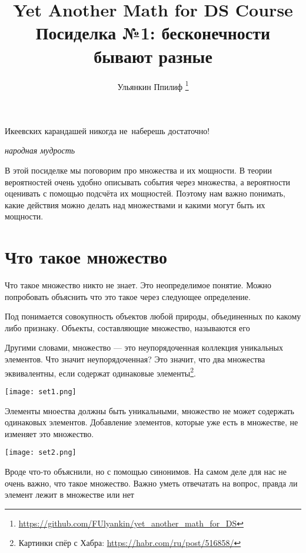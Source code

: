 \documentclass[12pt, a4paper]{article}
\date{ } %
\title{Yet Another Math for DS Course \\ Посиделка №1: бесконечности бывают разные}
\author{Ульянкин Ппилиф \thanks{\url{https://github.com/FUlyankin/yet_another_math_for_DS}}}
\begin{document}

\maketitle

\epigraph{Икеевских карандашей никогда не~наберешь достаточно!}{\textit{народная мудрость}}

В этой посиделке мы поговорим про множества и их мощности. В теории вероятностей очень удобно описывать события через множества, а вероятности оценивать с помощью подсчёта их мощностей. Поэтому нам важно понимать, какие действия можно делать над множествами и какими могут быть их мощности.

\section{Что такое множество} 

Что такое множество никто не знает. Это неопределимое понятие. Можно попробовать объяснить что это такое через следующее определение.

\begin{mydef}
Под  понимается совокупность объектов любой природы, объединенных по какому либо признаку. Объекты, составляющие множество, называются его  
\end{mydef}

Другими словами, множество --- это неупорядоченная коллекция уникальных элементов. Что значит неупорядоченная? Это значит, что два множества эквивалентны, если содержат одинаковые элементы\footnote{Картинки спёр с Хабра: \url{https://habr.com/ru/post/516858/}}.

\begin{center}
    \texttt{[image: set1.png]}
\end{center}

Элементы мноества должны быть уникальными, множество не может содержать одинаковых элементов. Добавление элементов, которые уже есть в множестве, не изменяет это множество.

\begin{center}
    \texttt{[image: set2.png]}
\end{center}

Вроде что-то объяснили, но с помощью синонимов. На самом деле для нас не очень важно, что такое множество. Важно уметь отвечатать на вопрос, правда ли элемент лежит в множестве или нет
\end{document}
